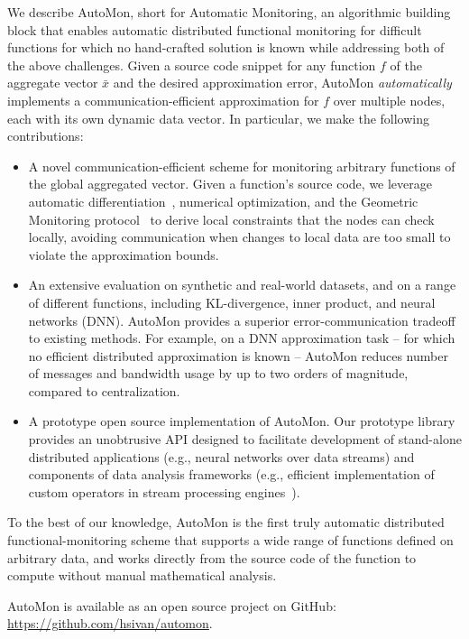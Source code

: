 We describe AutoMon, short for Automatic Monitoring, an algorithmic building block
that enables automatic distributed functional monitoring for difficult functions for which no hand-crafted solution is known while addressing both of the above challenges.
Given a source code snippet for any function $f$ of the aggregate vector $\bar{x}$ and the desired approximation error, AutoMon \emph{automatically} implements a communication-efficient approximation for $f$ over multiple nodes, each with its own dynamic data vector.
%
In particular, we make the following contributions:
\begin{itemize}[leftmargin=*]
    \item A novel communication-efficient scheme for monitoring arbitrary functions of the global aggregated vector.
    Given a function's source code, we leverage automatic differentiation~\cite{survey_on_automatic_differentiation}, numerical optimization, and the Geometric Monitoring protocol~\cite{lazerson:one_for_all,2021_icde_distance_lemma} to derive local constraints that the nodes can check locally, avoiding communication when changes to local data are too small to violate the approximation bounds.
    
    \item An extensive evaluation on synthetic and real-world datasets, and on a range of different functions, including KL-divergence, inner product, and neural networks (DNN).
    AutoMon provides a superior error-communication tradeoff to existing methods.
    For example, on a DNN approximation task -- for which no efficient distributed approximation is known -- AutoMon 
    reduces number of messages and bandwidth usage by up to two orders of magnitude, compared to centralization.

    \item A prototype open source implementation of AutoMon.
    Our prototype library provides an unobtrusive API designed to facilitate development of stand-alone distributed applications (e.g., neural networks over data streams) and components of data analysis frameworks (e.g., efficient implementation of custom operators in stream processing engines~\cite{flinkuserdefined}).
        
\end{itemize}
    
To the best of our knowledge, AutoMon is the first truly automatic distributed functional-monitoring scheme that supports a wide range of functions defined on arbitrary data, and works directly from the source code of the function to compute without manual mathematical analysis.

AutoMon is available as an open source project on GitHub: \\ \url{https://github.com/hsivan/automon}.